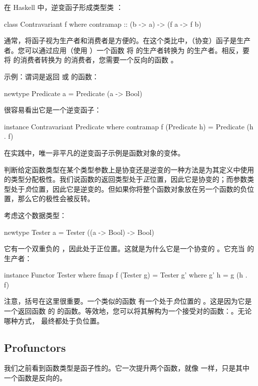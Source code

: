 \documentclass[DaoFP]{subfiles}
\begin{document}
在 Haskell 中，逆变函子形成类型类 ：
\begin{haskell}
class Contravariant f where
  contramap :: (b -> a) -> (f a -> f b)
\end{haskell}

通常，将函子视为生产者和消费者是方便的。在这个类比中，（协变）函子是生产者。您可以通过应用（使用 ）一个函数  将  的生产者转换为  的生产者。相反，要将  的消费者转换为  的消费者，您需要一个反向的函数 。

示例：谓词是返回  或  的函数：
\begin{haskell}
newtype Predicate a = Predicate (a -> Bool)
\end{haskell}
很容易看出它是一个逆变函子：
\begin{haskell}
instance Contravariant Predicate where
  contramap f (Predicate h) = Predicate (h . f)
\end{haskell}

在实践中，唯一非平凡的逆变函子示例是函数对象的变体。

判断给定函数类型在某个类型参数上是协变还是逆变的一种方法是为其定义中使用的类型分配极性。我们说函数的返回类型处于\emph{正}位置，因此它是协变的；而参数类型处于\emph{负}位置，因此它是逆变的。但如果你将整个函数对象放在另一个函数的负位置，那么它的极性会被反转。

考虑这个数据类型：
\begin{haskell}
newtype Tester a = Tester ((a -> Bool) -> Bool)
\end{haskell}
它有一个双重负的 ，因此处于正位置。这就是为什么它是一个协变的 。它充当  的生产者：

\begin{haskell}
instance Functor Tester where
  fmap f (Tester g) = Tester g'
    where g' h = g (h . f)
\end{haskell}

注意，括号在这里很重要。一个类似的函数  有一个处于\emph{负}位置的 。这是因为它是一个返回函数  的  的函数。等效地，您可以将其解构为一个接受对的函数：。无论哪种方式， 最终都处于负位置。

\subsection{Profunctors}

我们之前看到函数类型是函子性的。它一次提升两个函数，就像  一样，只是其中一个函数是反向的。
\end{document}
